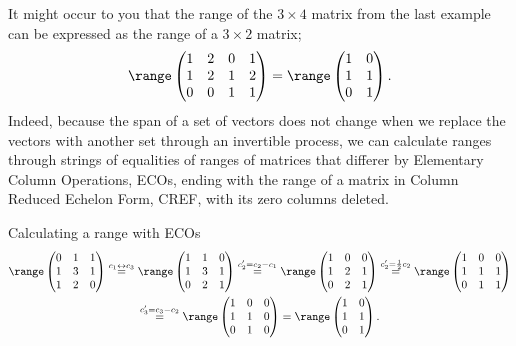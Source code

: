 It might occur to you that the range of the $3\times 4$ matrix from the last example can be expressed as the range of a $3\times 2$ matrix;
\[
\range  
\begin{pmatrix} 
1&2&0&1\\
1&2&1&2\\
0&0&1&1
\end{pmatrix} 
=\range  
\begin{pmatrix} 
1&0\\
1&1\\
0&1
\end{pmatrix}.\]
Indeed, because the span of a set of vectors does not change when we replace the vectors with another set through an invertible process, we can calculate ranges through strings of equalities of ranges of matrices that differer by Elementary Column Operations, ECOs, ending with the range of a matrix in Column Reduced Echelon Form, CREF, with its zero columns deleted.

\begin{example} Calculating a range with ECOs\\
\begin{gather*}
\range  
\begin{pmatrix} 
0&1&1\\
1&3&1\\
1&2&0
\end{pmatrix} 
\stackrel{c_1 \leftrightarrow c_3}{=}
\range  
\begin{pmatrix} 
1&1&0\\
1&3&1\\
0&2&1
\end{pmatrix} 
\stackrel{c_2'= c_2-c_1}{=}
\range  
\begin{pmatrix} 
1&0&0\\
1&2&1\\
0&2&1
\end{pmatrix} 
\stackrel{c_2'= \frac12 c_2}{=}
\range  
\begin{pmatrix} 
1&0&0\\
1&1&1\\
0&1&1
\end{pmatrix} 
\\\stackrel{c_3'= c_3-c_2}{=}
\range  
\begin{pmatrix} 
1&0&0\\
1&1&0\\
0&1&0
\end{pmatrix} 
=\range  
\begin{pmatrix} 
1&0\\
1&1\\
0&1
\end{pmatrix}. 
\end{gather*}


\end{example}


